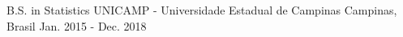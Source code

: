 \begin{cventries}
  \cvcompactentry
    {B.S. in Statistics}
    {UNICAMP - Universidade Estadual de Campinas}
    {Campinas, Brasil}
    {Jan. 2015 - Dec. 2018}
\end{cventries}


